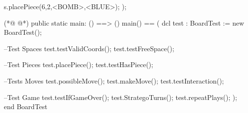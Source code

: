 \begin{vdmpp}[breaklines=true]
                s.placePiece(6,2,<BOMB>,<BLUE>);
                );
                
(*@
\label{main:231}
@*)
                public static main: () ==> ()
                main() ==
                (
                        dcl test : BoardTest := new BoardTest();
                        
                        --Test Spaces
                        test.testValidCoords();
                        test.testFreeSpace();
                        
                        --Test Pieces
                        test.placePiece();
                        test.testHasPiece();
                        
                        --Tests Moves
                        test.possibleMove();
                        test.makeMove();
                        test.testInteraction();
                        
                        --Test Game
                        test.testIfGameOver();
                        test.StrategoTurns();
                        test.repeatPlays();
                );
end BoardTest
\end{vdmpp}
